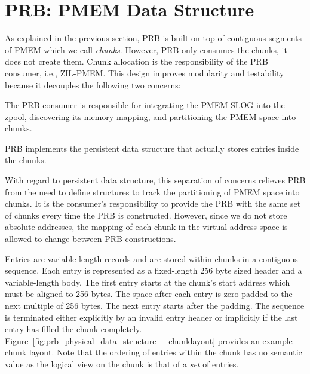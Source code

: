 \documentclass[12pt,a4paper,twoside]{book}
\begin{document}
\section{PRB: PMEM Data Structure}\label{di:prb:pmemdatastructure}
As explained in the previous section, PRB is built on top of contiguous segments of PMEM which we call \textit{chunks}.
However, PRB only consumes the chunks, it does not create them.
Chunk allocation is the responsibility of the PRB consumer, i.e., ZIL-PMEM.
This design improves modularity and testability because it decouples the following two concerns:
\begin{description}[noitemsep,leftmargin=1.5cm,labelindent=1cm]
    \item[Resource Acquisition] The PRB consumer is responsible for integrating the PMEM SLOG into the zpool, discovering its memory mapping, and partitioning the PMEM space into chunks.
    \item[PMEM Data Structure] PRB implements the persistent data structure that actually stores entries inside the chunks.
\end{description}
With regard to persistent data structure, this separation of concerns relieves PRB from the need to define structures to track the partitioning of PMEM space into chunks.
It is the consumer's responsibility to provide the PRB with the same set of chunks every time the PRB is constructed.
However, since we do not store absolute addresses, the mapping of each chunk in the virtual address space is allowed to change between PRB constructions.

Entries are variable-length records and are stored within chunks in a contiguous sequence.
Each entry is represented as a fixed-length 256 byte sized header and a variable-length body.
The first entry starts at the chunk's start address which must be aligned to 256 bytes.
The space after each entry is zero-padded to the next multiple of 256 bytes.
The next entry starts after the padding.
The sequence is terminated either explicitly by an invalid entry header or implicitly if the last entry has filled the chunk completely.
Figure~\ref{fig:prb_physical_data_structure__chunklayout} provides an example chunk layout.
Note that the ordering of entries within the chunk has no semantic value as the logical view on the chunk is that of a \textit{set} of entries.
\end{document}
